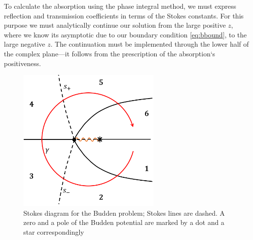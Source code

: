 \documentclass[aip,jmp,reprint]{revtex4-1}
\def\mytextwidth{0.63\textwidth}
\begin{document}
To calculate the absorption using the phase integral method, we must express 
reflection and transmission coefficients in terms of the Stokes constants. 
For this purpose we must analytically continue our solution from the large positive $z$,
where we know its asymptotic due to our boundary condition \eqref{eq:bbound}, to
the large negative $z$. The continuation must be implemented through the lower half of the
complex plane---it follows from the prescription of the absorption`s positiveness\cite{rwbook}.

\begin{figure}
\centering
\noindent
\includegraphics[width=\mytextwidth]{sd.png}
\caption
{Stokes diagram for the Budden problem; Stokes lines are dashed.
A zero and a pole of the Budden potential are marked by a dot and a star correspondingly}
\label{fig:diagram}
\end{figure} 
\end{document}
